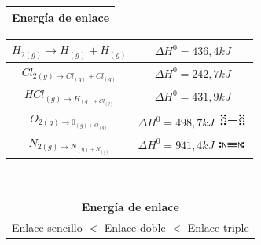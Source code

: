         \begin{center}
            \begin{tabular}{| c |}
                \toprule
                \textbf{Energía de enlace} \\
                \bottomrule
            \end{tabular}
            \begin{tabular}{| c | c |}
                \toprule
                $H_{2(g)} \rightarrow H_{(g)} + H_{(g)}$ & $\Delta H^0 = 436,4 kJ$ \\
                \midrule
                $Cl_{2(g) \rightarrow Cl_{(g)} + Cl_{(g)}}$ & $\Delta H^0 = 242,7 kJ$ \\
                \midrule
                $HCl_{(g) \rightarrow H_{(g) + Cl_{(g)}}}$ & $\Delta H^0 = 431,9 kJ$ \\
                \midrule
                $O_{2(g) \rightarrow 0_{(g) + O_{(g)}}}$ & $\Delta H^0 = 498,7 kJ$ \includegraphics[width=10mm]{./imagenes/diagramaLewisO2.png} \\
                \midrule
                $N_{2(g) \rightarrow N_{(g) + N_{(g)}}}$ & $\Delta H^0 = 941,4 kJ$ \includegraphics[width=10mm]{./imagenes/diagramaLewisH2.png} \\
                \bottomrule
            \end{tabular} \\[1cm]
            \begin{tabular}{| c |}
                \toprule
                \textbf{Energía de enlace} \\
                \midrule
                Enlace sencillo $<$ Enlace doble $<$ Enlace triple \\
                \bottomrule
            \end{tabular}
        \end{center}

